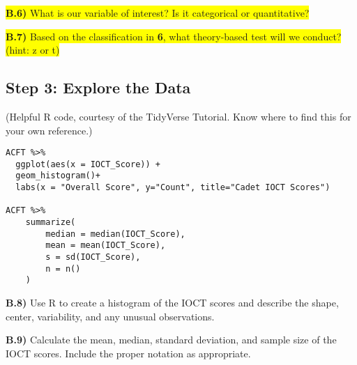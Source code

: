 \documentclass{article}
\newif\ifPrintSolution
\newcommand{\sol}[1]{\ifPrintSolution {\color{blue} #1 } \fi}
\begin{document}
\sol{$H_0: \mu = 800$. The true mean IOCT score for the Corps of Cadets is 800.\\
$H_a: \mu \ne 800$. The true mean IOCT score for the Corps of Cadets is not 800.}

\vspace{0.25in}

\colorbox{yellow}{\textbf{B.6)} What is our variable of interest? Is it categorical or quantitative?}

\sol{Our variable of interest is IOCT$\_$Score, which is a quantitative variable.}

\vspace{0.25in}

\colorbox{yellow}{\textbf{B.7)} Based on the classification in \textbf{6}, what theory-based test will we conduct? (hint: z or t)}

\sol{A quantitative variable will conduct a single-mean test with the \textit{t} statistic.}

\vspace{0.25in}

\subsection*{Step 3: Explore the Data}

(Helpful R code, courtesy of the TidyVerse Tutorial. Know where to find this for your own reference.) \color{blue}

\begin{verbatim}
ACFT %>% 
  ggplot(aes(x = IOCT_Score)) +
  geom_histogram()+
  labs(x = "Overall Score", y="Count", title="Cadet IOCT Scores")

ACFT %>% 
    summarize(
        median = median(IOCT_Score),
        mean = mean(IOCT_Score),
        s = sd(IOCT_Score),
        n = n()
    )
    \end{verbatim}
\color{black}

\textbf{B.8)} Use R to create a histogram of the IOCT scores and describe the shape, center, variability, and any unusual observations.

\sol{The shape appears to be evenly split between 750 and 950, with smaller tails from 680 to 1000. There is a larger peak at 780ish and centered about 800 or 850.}

\vspace{0.25in}

\textbf{B.9)} Calculate the mean, median, standard deviation, and sample size of the IOCT scores. Include the proper notation as appropriate.
\end{document}
